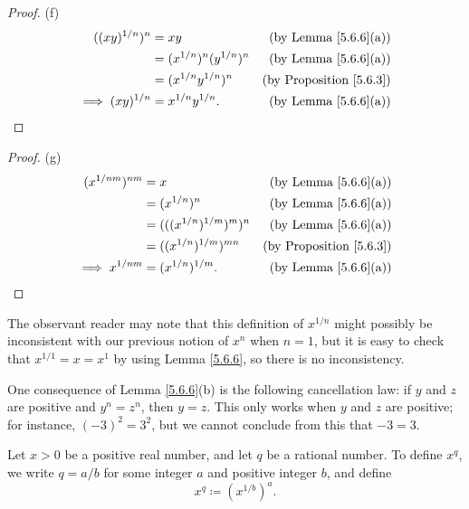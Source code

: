 \begin{proof}{(f)}
    \begin{align*}
        ((xy)^{1 / n})^n      & = xy                          & \text{(by Lemma \ref{5.6.6}(a))}    \\
                              & = (x^{1 / n})^n (y^{1 / n})^n & \text{(by Lemma \ref{5.6.6}(a))}    \\
                              & = (x^{1 / n} y^{1 / n})^n     & \text{(by Proposition \ref{5.6.3})} \\
        \implies (xy)^{1 / n} & = x^{1 / n} y^{1 / n}.        & \text{(by Lemma \ref{5.6.6}(a))}
    \end{align*}
\end{proof}

\begin{proof}{(g)}
    \begin{align*}
        (x^{1 / nm})^{nm}   & = x                           & \text{(by Lemma \ref{5.6.6}(a))}    \\
                            & = (x^{1 / n})^n               & \text{(by Lemma \ref{5.6.6}(a))}    \\
                            & = (((x^{1 / n})^{1 / m})^m)^n & \text{(by Lemma \ref{5.6.6}(a))}    \\
                            & = ((x^{1 / n})^{1 / m})^{mn}  & \text{(by Proposition \ref{5.6.3})} \\
        \implies x^{1 / nm} & = (x^{1 / n})^{1 / m}.        & \text{(by Lemma \ref{5.6.6}(a))}
    \end{align*}
\end{proof}

\begin{note}
    The observant reader may note that this definition of \(x^{1 / n}\) might possibly be inconsistent with our previous notion of \(x^n\) when \(n = 1\), but it is easy to check that \(x^{1 / 1} = x = x^1\) by using Lemma \ref{5.6.6}, so there is no inconsistency.
\end{note}

\begin{note}
    One consequence of Lemma \ref{5.6.6}(b) is the following cancellation law:
    if \(y\) and \(z\) are positive and \(y^n = z^n\), then \(y = z\).
    This only works when \(y\) and \(z\) are positive;
    for instance, \((-3)^2 = 3^2\), but we cannot conclude from this that \(-3 = 3\).
\end{note}

\begin{definition}\label{5.6.7}
    Let \(x > 0\) be a positive real number, and let \(q\) be a rational number.
    To define \(x^q\), we write \(q = a / b\) for some integer \(a\) and positive integer \(b\), and define
    \[
        x^q \coloneqq (x^{1 / b})^a.
    \]
\end{definition}

